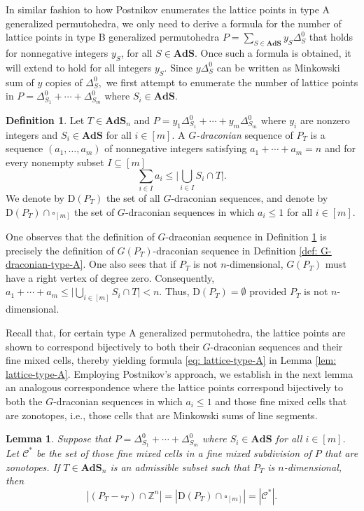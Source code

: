 \documentclass[12pt,reqno]{article}%
\newtheorem{lem}[thm]{Lemma}
\theoremstyle{definition}
\newtheorem{defn}[thm]{Definition}
\numberwithin{equation}{section}
\newcommand{\Z}{\mathbb Z}
\newcommand{\calC}{\mathcal{C}}
\newcommand{\ads}{\mathbf{AdS}}
\newcommand{\sym}{\Delta^0}
\begin{document}
In similar fashion to how Postnikov enumerates the lattice points in type A generalized permutohedra, we only need to derive a formula for the number of lattice points in type B generalized permutohedra $P = \sum_{S \in \ads} y_S\Delta^0_S$ that holds for nonnegative integers $y_S$, for all $S \in \ads.$ Once such a formula is obtained, it will extend to hold for all integers $y_S.$ Since  $y\sym_S$ can be written as Minkowski sum of $y$ copies of $\sym_S,$ we first attempt to enumerate the number of lattice points in $P = \Delta^0_{S_1} + \cdots + \Delta^0_{S_m}$ where $S_i \in \ads.$

\begin{defn}\label{def: G-draconian-seq-for-typeB}
    Let $T \in \ads_n$ and $P = y_1\Delta^0_{S_1} + \cdots + y_m\Delta^0_{S_m}$ where $y_i$ are nonzero integers and $S_i \in \ads$ for all $i \in [m]$. A \emph{$G$-draconian} sequence of $P_T$ is a sequence $(a_1, \dots, a_m)$ of nonnegative integers satisfying $a_1 + \cdots + a_m = n$ and for every nonempty subset $I \subseteq [m]$
    \[\sum_{i \in I}a_i \leq \big| \bigcup_{i \in I} S_i\cap T \big|.\]
    We denote by $\mathrm{D}(P_T)$ the set of all $G$-draconian sequences, and denote by $\mathrm{D}(P_T)\cap \square_{[m]}$ the set of $G$-draconian sequences in which $a_i \leq 1$ for all $i \in [m]$.
\end{defn}

One observes that the definition of $G$-draconian sequence in Definition \ref{def: G-draconian-seq-for-typeB} is precisely the definition of $G(P_T)$-draconian sequence in Definition \ref{def: G-draconian-type-A}. One also sees that if $P_T$ is not $n$-dimensional, $G(P_T)$ must have a right vertex of degree zero. Consequently, $a_1 + \cdots + a_m \leq \big| \bigcup_{i \in [m]} S_i\cap T \big| < n.$ Thus, $\mathrm{D}(P_T) = \emptyset$ provided $P_T$ is not $n$-dimensional.

Recall that, for certain type A generalized permutohedra, the lattice points are shown to correspond bijectively to both their $G$-draconian sequences and their fine mixed cells, thereby yielding formula \eqref{eq: lattice-type-A} in Lemma \ref{lem: lattice-type-A}. Employing Postnikov's approach, we establish in the next lemma an analogous correspondence where the lattice points correspond bijectively to both the $G$-draconian sequences in which $a_i \leq 1$ and those fine mixed cells that are zonotopes, i.e., those cells that are Minkowski sums of line segments.

\begin{lem}\label{lem: fine-mixed-subdivision-latticepts}
    Suppose that $P = \Delta^0_{S_1} + \cdots + \Delta^0_{S_m}$ where $S_i \in \ads$ for all $i \in [m]$. Let $\calC^*$ be the set of those fine mixed cells in a fine mixed subdivision of $P$ that are zonotopes. If $T \in \ads_n$ is an admissible subset such that $P_T$ is $n$-dimensional, then 
    \[|(P_T - \square_T)\cap \Z^n| = |\mathrm{D}(P_T)\cap \square_{[m]}|= |\calC^*|.\]
\end{lem}
\end{document}
